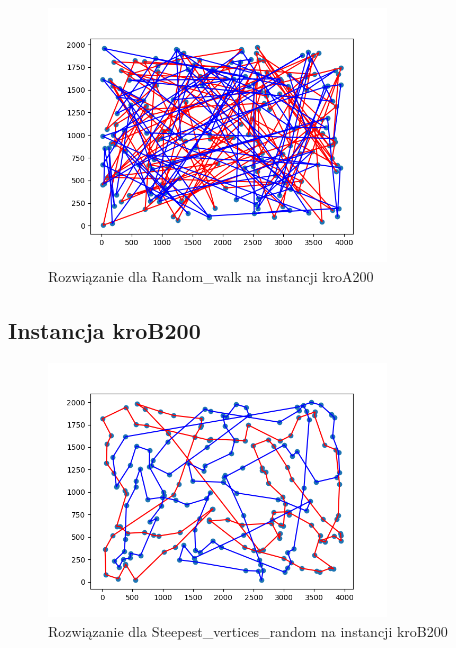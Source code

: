 \documentclass[12pt,a4paper]{article}
\begin{document}
\begin{figure}[H]
\centering
\includegraphics[width=0.8\textwidth]{figures/kroA_random_walk.png}
\caption{Rozwiązanie dla Random\_walk na instancji kroA200}
\end{figure}

\subsection{Instancja kroB200}

\begin{figure}[H]
\centering
\includegraphics[width=0.8\textwidth]{figures/kroB_Steepest_V_random.png}
\caption{Rozwiązanie dla Steepest\_vertices\_random na instancji kroB200}
\end{figure}
\end{document}
